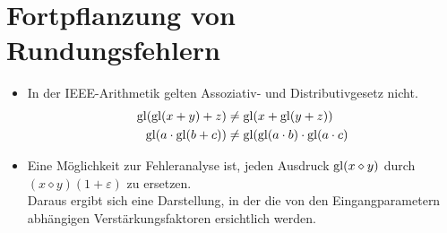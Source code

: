 	\section{Fortpflanzung von Rundungsfehlern} %
		\begin{itemize}
			\item In der IEEE-Arithmetik gelten Assoziativ- und Distributivgesetz nicht.
				\begin{align*}
					\operatorname{gl}(\operatorname{gl}(x + y) + z)     & \neq \operatorname{gl}(x + \operatorname{gl}(y + z))                     \\
					\operatorname{gl}(a \cdot \operatorname{gl}(b + c)) & \neq \operatorname{gl}(\operatorname{gl}(a \cdot b) \cdot \operatorname{gl}(a \cdot c)
				\end{align*}
			\item Eine Möglichkeit zur Fehleranalyse ist, jeden Ausdruck \( \operatorname{gl}(x \diamond y) \) durch \( (x \diamond y)(1 + \varepsilon) \) zu ersetzen. \\ Daraus ergibt sich eine Darstellung, in der die von den Eingangparametern abhängigen Verstärkungsfaktoren ersichtlich werden.
		\end{itemize}

